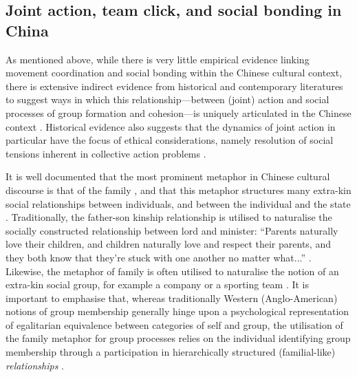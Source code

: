 {  \subsection{Joint action, team click, and social bonding in China}
  As mentioned above, while there is very little empirical evidence linking movement coordination and social bonding within the Chinese cultural context, there is extensive indirect evidence from historical and contemporary literatures to suggest ways in which this relationship---between (joint) action and social processes of group formation and cohesion---is uniquely articulated in the Chinese context \citep{Weed2011}.  Historical evidence also suggests that the dynamics of joint action in particular have the focus of ethical considerations, namely resolution of social tensions inherent in collective action problems \citep{Slingerland2014}.

  It is well documented that the most prominent metaphor in Chinese cultural discourse is that of the family \citep{Maehr1980}, and that this metaphor structures many extra-kin social relationships between individuals, and between the individual and the state \citep{Gold2002}.  Traditionally, the father-son kinship relationship is utilised to naturalise the socially constructed relationship between lord and minister: ``Parents naturally love their children, and children naturally love and respect their parents, and they both know that they're stuck with one another no matter what...'' \citep[178]{Slingerland2014}. Likewise, the metaphor of family is often utilised to naturalise the notion of an extra-kin social group, for example a company or a sporting team \citep{Brownell2008}.
  It is important to emphasise that, whereas traditionally Western (Anglo-American) notions of group membership generally hinge upon a psychological representation of egalitarian equivalence between categories of self and group, the utilisation of the family metaphor for group processes relies on the individual identifying group membership through a participation in hierarchically structured (familial-like) \textit{relationships} \citep{Fei1992}.

}
